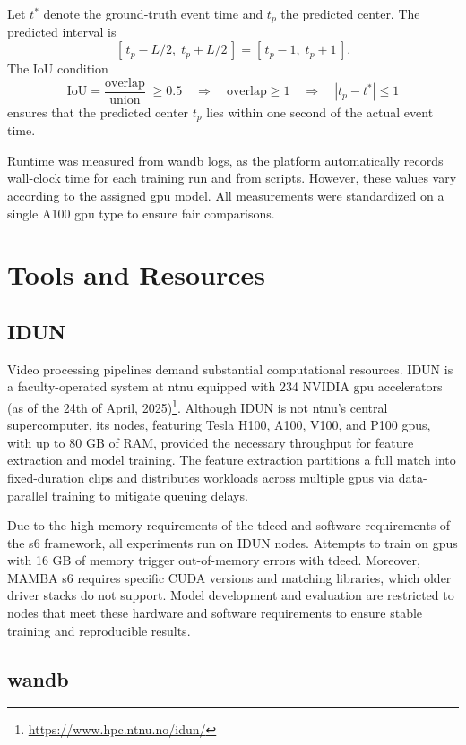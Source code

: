 Let $t^*$ denote the ground‐truth event time and $t_p$ the predicted center. The predicted interval is
\[
    [\,t_p - L/2,\;t_p + L/2\,]
    = [\,t_p - 1,\;t_p + 1\,].
\] 
The IoU condition
\[
    \mathrm{IoU}
    = \frac{\text{overlap}}{\text{union}}
    \;\ge0.5
    \quad\Longrightarrow\quad
    \text{overlap}\ge1
    \quad\Longrightarrow\quad
    |t_p - t^*|\le1
\]
ensures that the predicted center $t_p$ lies within one second of the actual event time.

Runtime was measured from \acrshort{wandb} logs, as the platform automatically records wall-clock time for each training run and from scripts. However, these values vary according to the assigned \acrshort{gpu} model. All measurements were standardized on a single A100 \acrshort{gpu} type to ensure fair comparisons. 
\section{Tools and Resources}
\label{sec:tools_and_resources}

\subsection{IDUN}
\label{ssec:idun}
Video processing pipelines demand substantial computational resources. IDUN is a faculty-operated system at \acrfull{ntnu} equipped with 234 NVIDIA \acrfull{gpu} accelerators (as of the 24th of April, 2025)\footnote{\url{https://www.hpc.ntnu.no/idun/}}. Although IDUN is not \acrshort{ntnu}'s central supercomputer, its nodes, featuring Tesla H100, A100, V100, and P100 \acrshort{gpu}s, with up to 80 GB of RAM, provided the necessary throughput for feature extraction and model training. The feature extraction partitions a full match into fixed-duration clips and distributes workloads across multiple \acrshort{gpu}s via data-parallel training to mitigate queuing delays.


Due to the high memory requirements of the \acrfull{tdeed} and software requirements of the \acrfull{s6} framework, all experiments run on IDUN nodes. Attempts to train on \acrshort{gpu}s with 16 GB of memory trigger out-of-memory errors with \acrshort{tdeed}. Moreover, MAMBA \acrshort{s6} requires specific CUDA versions and matching libraries, which older driver stacks do not support. Model development and evaluation are restricted to nodes that meet these hardware and software requirements to ensure stable training and reproducible results. 

\subsection{\acrfull{wandb}}
\label{ssec:wandb}

